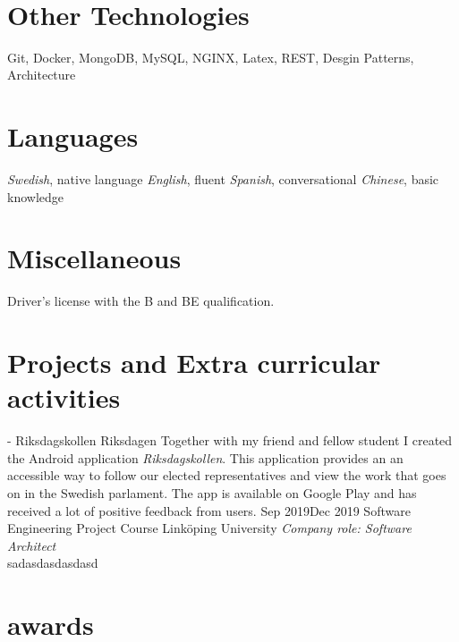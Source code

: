\documentclass[]{k-cv} %
\begin{document}
\begin{aside}
~
~\color{gray}
\section{Other Technologies}
Git, Docker, MongoDB, MySQL, NGINX, Latex, REST, Desgin Patterns, Architecture 

\section{Languages}
\textit{Swedish}, native language
\textit{English}, fluent
\textit{Spanish}, conversational
\textit{Chinese}, basic knowledge
\section{Miscellaneous}
Driver's license with the B and BE qualification.
\end{aside}
\section{Projects and Extra curricular activities}
\begin{entrylist}
\entry
{-}
{Riksdagskollen}
{Riksdagen}
{Together with my friend and fellow student I created the Android application \textit{Riksdagskollen}. This application provides an an accessible way to follow our elected representatives and view the work that goes on in the Swedish parlament. The app is available on Google Play and has received a lot of positive feedback from users.}
\entry
{Sep 2019\newline\to Dec 2019 }
{Software Engineering Project Course}
{Linköping University}
{\emph{Company role: Software Architect}\\ sadasdasdasdasd }
\end{entrylist}




\section{awards}
\end{document}
